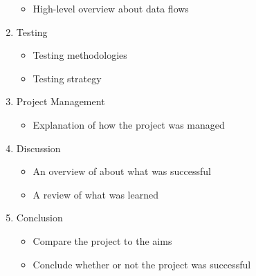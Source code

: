 \begin{enumerate}
\begin{itemize}
            \item High-level overview about data flows
        \end{itemize}
    \item Testing
        \begin{itemize}
            \item Testing methodologies
            \item Testing strategy
        \end{itemize}
    \item Project Management
        \begin{itemize}
            \item Explanation of how the project was managed
        \end{itemize}
    \item Discussion
        \begin{itemize}
            \item An overview of about what was successful
            \item A review of what was learned
        \end{itemize}
    \item Conclusion
        \begin{itemize}
            \item Compare the project to the aims
            \item Conclude whether or not the project was successful
        \end{itemize}
\end{enumerate}


